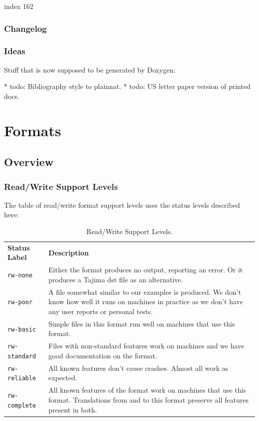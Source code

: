 \documentclass[a4paper]{report}
\begin{document}
index 162


\subsection{Changelog}

\subsection{Ideas}

Stuff that is now supposed to be generated by Doxygen:

* todo: Bibliography style to plainnat.
* todo: US letter paper version of printed docs.

\chapter{Formats}

\section{Overview}

\subsection{Read/Write Support Levels}

The table of read/write format support levels uses the status levels described here:

\begin{longtable}{p{4cm} p{8cm}}
\caption{Read/Write Support Levels.}
\label{tab:read-write-support} \\
\textbf{Status Label} &
\textbf{Description} \\

\texttt{rw-none} &
Either the format produces no output, reporting an error. Or it produces a
Tajima dst file as an alternative. \\

\texttt{rw-poor} &
A file somewhat similar to our examples is produced. We don't know how well
it runs on machines in practice as we don't have any user reports or personal
tests. \\

\texttt{rw-basic} &
Simple files in this format run well on machines that use this format. \\

\texttt{rw-standard} &
Files with non-standard features work on machines and we have good documentation
on the format. \\

\texttt{rw-reliable} &
All known features don't cause crashes. Almost all work as expected. \\

\texttt{rw-complete} &
All known features of the format work on machines that use this format.
Translations from and to this format preserve all features present in both.
\end{longtable}
\end{document}
